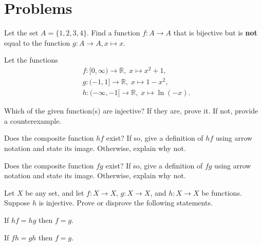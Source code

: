 \newpage

\section{Problems}
\begin{problem}
    Let the set $A = \{1, 2, 3, 4\}$. Find a function $f: A \to A$ that is bijective but is \textbf{not} equal to the function $g: A \to A, x \mapsto x$.
\end{problem}

\begin{problem}
    Let the functions
    \begin{align*}
        &f: [0, \infty) \to \mathbb{R},\; x\mapsto x^2+1,\\
        &g: (-1, 1] \to \mathbb{R},\; x\mapsto 1-x^2,\\
        &h: (-\infty, -1] \to \mathbb{R},\; x\mapsto \ln(-x).
    \end{align*}
    \begin{partquestions}{\alph*}
        \item Which of the given function(s) are injective? If they are, prove it. If not, provide a counterexample.
        \item Does the composite function $hf$ exist? If so, give a definition of $hf$ using arrow notation and state its image. Otherwise, explain why not.
        \item Does the composite function $fg$ exist? If so, give a definition of $fg$ using arrow notation and state its image. Otherwise, explain why not.
    \end{partquestions}
\end{problem}

\begin{problem}
    Let $X$ be any set, and let $f: X \to X$, $g: X \to X$, and $h: X \to X$ be functions. Suppose $h$ is injective. Prove or disprove the following statements.
    \begin{partquestions}{\alph*}
        \item If $hf = hg$ then $f = g$.
        \item If $fh = gh$ then $f = g$.
    \end{partquestions}
\end{problem}

